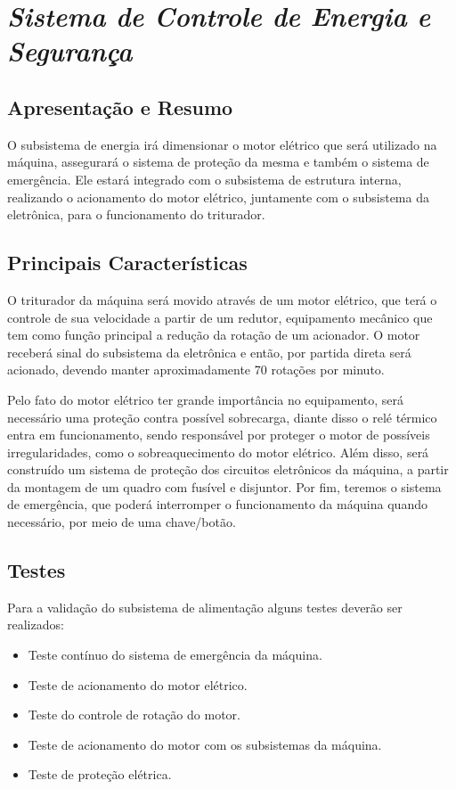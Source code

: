 \section{\textit{Sistema de Controle de Energia e Segurança}}

\subsection{Apresentação e Resumo}

    O subsistema de energia irá dimensionar o motor elétrico que será utilizado na máquina, assegurará o sistema de proteção da mesma e também o sistema de emergência. Ele estará integrado com o subsistema de estrutura interna, realizando o acionamento do motor elétrico, juntamente com o subsistema da eletrônica, para o funcionamento do triturador.

\subsection{Principais Características}

    O triturador  da  máquina será movido através de um motor elétrico, que terá o controle de sua velocidade a partir de um redutor, equipamento mecânico que tem como função principal a redução da rotação de um acionador. O motor receberá sinal do subsistema da eletrônica e então, por partida direta será acionado, devendo manter aproximadamente 70 rotações por minuto.

    Pelo fato do motor elétrico ter grande importância no equipamento, será necessário uma proteção contra possível sobrecarga, diante disso o relé térmico entra em funcionamento, sendo responsável por proteger o motor de possíveis irregularidades, como o sobreaquecimento do motor elétrico. Além disso, será construído um sistema de proteção dos circuitos eletrônicos da máquina, a partir da montagem de um quadro com fusível e disjuntor. Por fim, teremos o sistema de emergência, que poderá interromper o funcionamento da máquina quando necessário, por meio de uma chave/botão.

\subsection{Testes}

    Para a validação do subsistema de alimentação alguns testes deverão ser realizados:

\begin{itemize}
\item Teste contínuo do sistema de emergência da máquina.
\item Teste de acionamento do motor elétrico.
\item Teste do controle de rotação do motor.
\item Teste de acionamento do motor com os subsistemas da máquina.
\item Teste de proteção elétrica.
\end{itemize}

